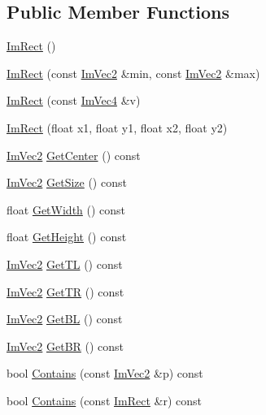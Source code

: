 \subsection*{Public Member Functions}
\begin{DoxyCompactItemize}
\item 
\mbox{\hyperlink{struct_im_rect_a57399f36758ed3eb1eb762143401ff54}{Im\+Rect}} ()
\item 
\mbox{\hyperlink{struct_im_rect_a2f0ff273434bfd9d22bb699fd7a63a1f}{Im\+Rect}} (const \mbox{\hyperlink{struct_im_vec2}{Im\+Vec2}} \&min, const \mbox{\hyperlink{struct_im_vec2}{Im\+Vec2}} \&max)
\item 
\mbox{\hyperlink{struct_im_rect_adfe8d43381f9af8a3e3ea32a3821ab84}{Im\+Rect}} (const \mbox{\hyperlink{struct_im_vec4}{Im\+Vec4}} \&v)
\item 
\mbox{\hyperlink{struct_im_rect_a4cd168f1ae088e15db64b95b880f8933}{Im\+Rect}} (float x1, float y1, float x2, float y2)
\item 
\mbox{\hyperlink{struct_im_vec2}{Im\+Vec2}} \mbox{\hyperlink{struct_im_rect_aae13f8003184fd84f29d27c3c074cf43}{Get\+Center}} () const
\item 
\mbox{\hyperlink{struct_im_vec2}{Im\+Vec2}} \mbox{\hyperlink{struct_im_rect_ae459d9c50003058cfb34519a571aaf33}{Get\+Size}} () const
\item 
float \mbox{\hyperlink{struct_im_rect_afa75cb8491f20901c96166d17dcddac4}{Get\+Width}} () const
\item 
float \mbox{\hyperlink{struct_im_rect_a748d8ae9cb26508951ec6e2f2df0625b}{Get\+Height}} () const
\item 
\mbox{\hyperlink{struct_im_vec2}{Im\+Vec2}} \mbox{\hyperlink{struct_im_rect_a1d4d972329722b51dca4499cb5931b4b}{Get\+TL}} () const
\item 
\mbox{\hyperlink{struct_im_vec2}{Im\+Vec2}} \mbox{\hyperlink{struct_im_rect_acae90248a96be4acf1524071fca1c3f3}{Get\+TR}} () const
\item 
\mbox{\hyperlink{struct_im_vec2}{Im\+Vec2}} \mbox{\hyperlink{struct_im_rect_a59d9751bc7be6745dddf5b83b9155669}{Get\+BL}} () const
\item 
\mbox{\hyperlink{struct_im_vec2}{Im\+Vec2}} \mbox{\hyperlink{struct_im_rect_ad2f2687254beed5a9b19bde0d6fa14f5}{Get\+BR}} () const
\item 
bool \mbox{\hyperlink{struct_im_rect_ac583156fd0e9306181fff5d120b262ea}{Contains}} (const \mbox{\hyperlink{struct_im_vec2}{Im\+Vec2}} \&p) const
\item 
bool \mbox{\hyperlink{struct_im_rect_ad6043344d8ac30d5f342c71641cfe24b}{Contains}} (const \mbox{\hyperlink{struct_im_rect}{Im\+Rect}} \&r) const

\end{DoxyCompactItemize}
